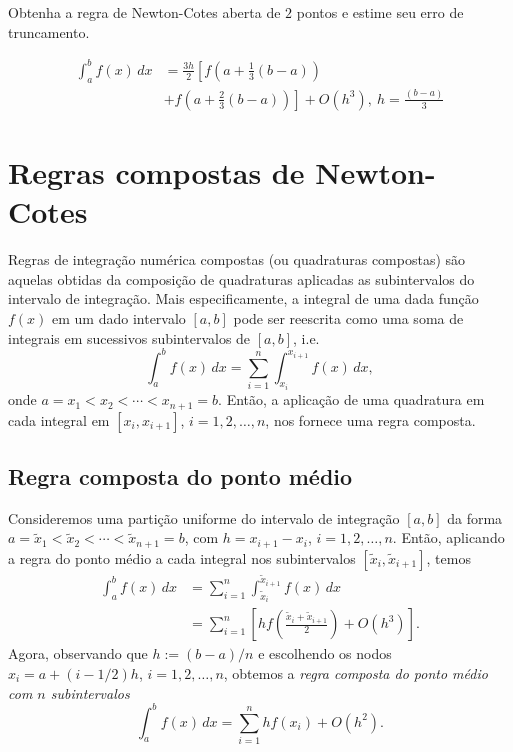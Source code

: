 \begin{exer}\label{exer:NC_aberta_2pts}
  Obtenha a regra de Newton-Cotes aberta de $2$ pontos e estime seu erro de truncamento.
\end{exer}
\begin{resp}
  \begin{align}
    \displaystyle \int_a^bf(x)\,dx &= \frac{3h}{2}\left[f\left(a+\frac{1}{3}(b-a)\right)\right. \\
    &+ \left. f\left(a + \frac{2}{3}(b-a)\right)\right] + O(h^3), ~h=\frac{(b-a)}{3}
  \end{align}
\end{resp}

\section{Regras compostas de Newton-Cotes}\label{cap_integr_sec_int_comp}

Regras de integração numérica compostas (ou quadraturas compostas) são aquelas obtidas da composição de quadraturas aplicadas as subintervalos do intervalo de integração. Mais especificamente, a integral de uma dada função $f(x)$ em um dado intervalo $[a, b]$ pode ser reescrita como uma soma de integrais em sucessivos subintervalos de $[a, b]$, i.e.
\begin{equation}
  \int_a^b f(x)\,dx = \sum_{i=1}^{n} \int_{x_i}^{x_{i+1}}f(x)\,dx,
\end{equation}
onde $a=x_1 < x_2 < \cdots < x_{n+1}=b$. Então, a aplicação de uma quadratura em cada integral em $[x_i, x_{i+1}]$, $i=1, 2, \dotsc, n$, nos fornece uma regra composta.

\subsection{Regra composta do ponto médio}

Consideremos uma partição uniforme do intervalo de integração $[a, b]$ da forma $a=\tilde{x}_1 < \tilde{x}_2 < \cdots < \tilde{x}_{n+1}=b$, com $h=x_{i+1}-x_{i}$, $i=1, 2, \dotsc, n$. Então, aplicando a regra do ponto médio a cada integral nos subintervalos $[\tilde{x}_i, \tilde{x}_{i+1}]$, temos
\begin{align}
  \int_a^b f(x)\,dx &= \sum_{i=1}^{n}\int_{\tilde{x}_i}^{\tilde{x}_{i+1}}f(x)\,dx\\
  &= \sum_{i=1}^n \left[hf\left(\frac{\tilde{x}_i+\tilde{x}_{i+1}}{2}\right) + O(h^3)\right].
\end{align}
Agora, observando que $h:=(b-a)/n$ e escolhendo os nodos $x_i = a + (i-1/2)h$, $i=1, 2, \dotsc, n$, obtemos a \emph{regra composta do ponto médio com $n$ subintervalos}
\begin{equation}
  \int_a^b f(x)\,dx = \sum_{i=1}^n hf(x_i) + O(h^2).
\end{equation}

